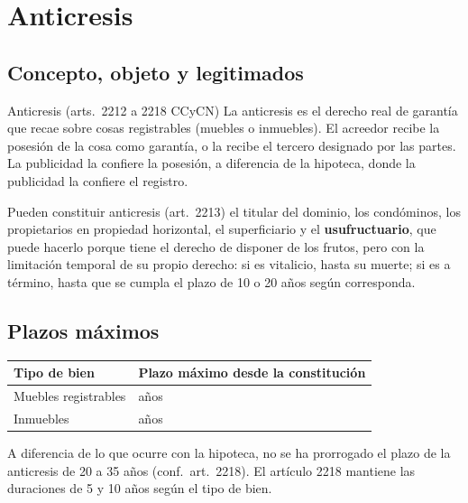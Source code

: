 \documentclass[12pt,oneside]{book}
\begin{document}
\section{Anticresis}

\subsection{Concepto, objeto y legitimados}

\begin{definition}{Anticresis (arts.~2212 a 2218 CCyCN)}
La anticresis es el derecho real de garantía que recae sobre cosas registrables (muebles o inmuebles). El acreedor recibe la posesión de la cosa como garantía, o la recibe el tercero designado por las partes. La publicidad la confiere la posesión, a diferencia de la hipoteca, donde la publicidad la confiere el registro.
\end{definition}

Pueden constituir anticresis (art.~2213) el titular del dominio, los condóminos, los propietarios en propiedad horizontal, el superficiario y el \textbf{usufructuario}, que puede hacerlo porque tiene el derecho de disponer de los frutos, pero con la limitación temporal de su propio derecho: si es vitalicio, hasta su muerte; si es a término, hasta que se cumpla el plazo de 10 o 20 años según corresponda.

\subsection{Plazos máximos}

\begin{table}[H]
\centering
\begin{tabularx}{\textwidth}{@{}>{\raggedright\arraybackslash}p{}>{\raggedright\arraybackslash}X@{}}
\toprule
\textbf{Tipo de bien} & \textbf{Plazo máximo desde la constitución} \\
\midrule
Muebles registrables & 5 años \\
Inmuebles & 10 años \\
\bottomrule
\end{tabularx}
\end{table}

\begin{note}
A diferencia de lo que ocurre con la hipoteca, no se ha prorrogado el plazo de la anticresis de 20 a 35 años (conf.~art.~2218). El artículo 2218 mantiene las duraciones de 5 y 10 años según el tipo de bien.
\end{note}
\end{document}
